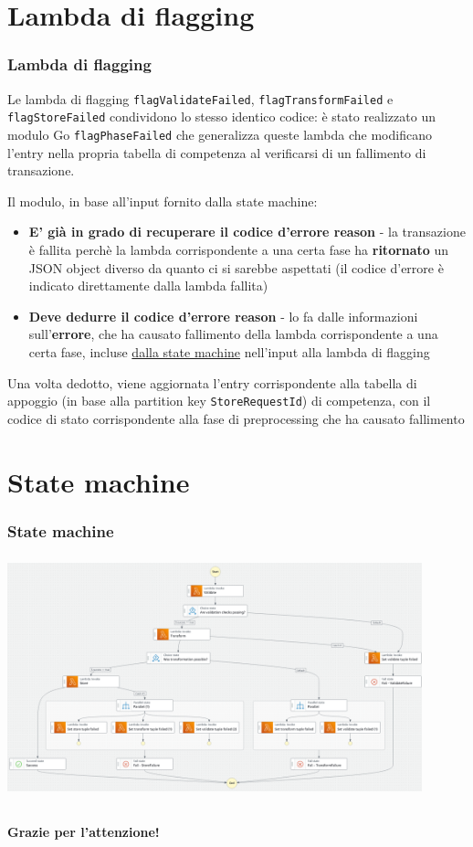 \documentclass{beamer}
\newcommand{\dflvspace}{\vspace{10pt}}
\begin{document}
\section{Lambda di flagging}
\begin{frame}
    \frametitle{Lambda di flagging}

    \fontsize{10pt}{10pt}\selectfont

    Le lambda di flagging \texttt{flagValidateFailed}, \texttt{flagTransformFailed} e \texttt{flagStoreFailed}
    condividono lo stesso identico codice: è stato realizzato un modulo Go \texttt{flagPhaseFailed} che generalizza
    queste lambda che modificano l'entry nella propria tabella di competenza al verificarsi di un fallimento
    di transazione.

    \dflvspace

    Il modulo, in base all'input fornito dalla state machine:
    \begin{itemize}
        \item \textbf{E' già in grado di recuperare il codice d'errore reason} - la transazione è fallita perchè
        la lambda corrispondente a una certa fase ha \textbf{ritornato} un JSON object diverso da quanto ci si 
        sarebbe aspettati (il codice d'errore è indicato direttamente dalla lambda fallita)
        \item \textbf{Deve dedurre il codice d'errore reason} - lo fa dalle informazioni sull'\textbf{errore}, che 
        ha causato fallimento della lambda corrispondente a una certa fase, incluse \underline{dalla state machine}
        nell'input alla lambda di flagging
    \end{itemize}

    \dflvspace

    Una volta dedotto, viene aggiornata l'entry corrispondente alla tabella di appoggio (in base alla partition key 
    \texttt{StoreRequestId}) di competenza, con il codice di stato corrispondente alla fase di preprocessing che ha 
    causato fallimento
    
\end{frame}

\section{State machine}
\begin{frame}
    \frametitle{State machine}

    \includegraphics[width=12cm, height=7cm]{whole-sfn}
\end{frame}

\begin{frame}
    \frametitle{}
    
    \fontsize{30pt}{10pt}\selectfont
    \centering
    \textbf{Grazie per l'attenzione!}
    
\end{frame}
\end{document}
